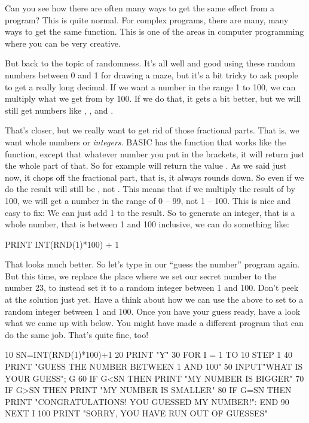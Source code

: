 Can you see how there are often many ways to get the same effect from
a program? This is quite normal. For complex programs, there are
many, many ways to get the same function.  This is one of the areas
in computer programming where you can be very creative.

But back to the topic of randomness. It's all well and good using
these random numbers between 0 and 1 for drawing a maze, but it's a
bit tricky to ask people to get a really long decimal.  If we want a
number in the range 1 to 100, we can multiply what we get from
 by 100. If we do that, it gets a bit better, but we will
still get numbers like , ,
 and .

\needspace{3cm}
That's closer, but we really want to get rid of those fractional
parts. That is, we want whole numbers or {\em integers}.  BASIC has
the  function that works like the  function,
except that whatever number you put in the brackets, it will return
just the whole part of that.  So for example  will
return the value . As we said just now, it chops off the
fractional part, that is, it always rounds down. So even if we do
 the result will still be , not .
This means that if we multiply the result of  by 100, we
will get a number in the range of 0 -- 99, not 1 -- 100. This is nice
and easy to fix: We can just add 1 to the result.  So to generate an
integer, that is a whole number, that is between 1 and 100 inclusive,
we can do something like:

\begin{screencode}
  PRINT INT(RND(1)*100) + 1
\end{screencode}

\needspace{3cm}
That looks much better. So let's type in our ``guess the number''
program again. But this time, we replace the place where we set
our secret number to the number 23, to instead set it to a random
integer between 1 and 100.  Don't peek at the solution just yet. Have a
think about how we can use the above to set  to a random
integer between 1 and 100.  Once you have your guess ready, have a
look what we came up with below. You might have made a different
program that can do the same job. That's quite fine, too!

\begin{screencode}
10 SN=INT(RND(1)*100)+1
20 PRINT "Ƴ"
30 FOR I = 1 TO 10 STEP 1
40 PRINT "GUESS THE NUMBER BETWEEN 1 AND 100"
50 INPUT"WHAT IS YOUR GUESS"; G
60 IF G<SN THEN PRINT "MY NUMBER IS BIGGER"
70 IF G>SN THEN PRINT "MY NUMBER IS SMALLER"
80 IF G=SN THEN PRINT "CONGRATULATIONS! YOU GUESSED MY NUMBER!": END
90 NEXT I
100 PRINT "SORRY, YOU HAVE RUN OUT OF GUESSES"
\end{screencode}

